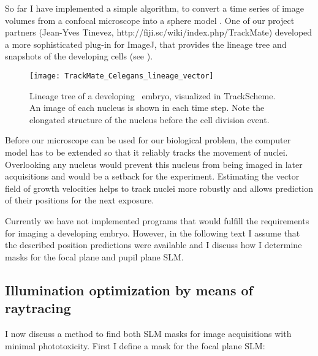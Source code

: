 So far I have implemented a simple algorithm, to convert a time series
of image volumes from a confocal microscope into a sphere model
\citep{Santella2010}.  One of our project partners (Jean-Yves Tinevez,
http://fiji.sc/wiki/index.php/TrackMate) developed a more
sophisticated plug-in for ImageJ, that provides the lineage tree and
snapshots of the developing cells (see ).
\begin{figure}[!hbt] \centering
  \qquad
  \texttt{[image: TrackMate\_Celegans\_lineage\_vector]} 
  \caption{Lineage tree of a developing \celegans\ embryo, visualized
    in TrackScheme. An image of each nucleus is shown in each time
    step. Note the elongated structure of the nucleus before the cell
    division event.}
  \label{fig:trackmate}
\end{figure} Before our microscope can be used for our biological
problem, the computer model has to be extended so that it reliably
tracks the movement of nuclei.  Overlooking any nucleus would prevent
this nucleus from being imaged in later acquisitions and would be a
setback for the experiment.  Estimating the vector field of growth
velocities helps to track nuclei more robustly and allows prediction
of their positions for the next exposure.

Currently we have not implemented programs that would fulfill the
requirements for imaging a developing embryo.  However, in the
following text I assume that the described position predictions were
available and I discuss how I determine masks for the focal plane and
pupil plane SLM.





\subsection{Illumination optimization by means of raytracing} 
\label{sec:illum-opt}
I now discuss a method to find both SLM masks for image acquisitions
with minimal phototoxicity. First I define a mask for the focal plane
SLM:

